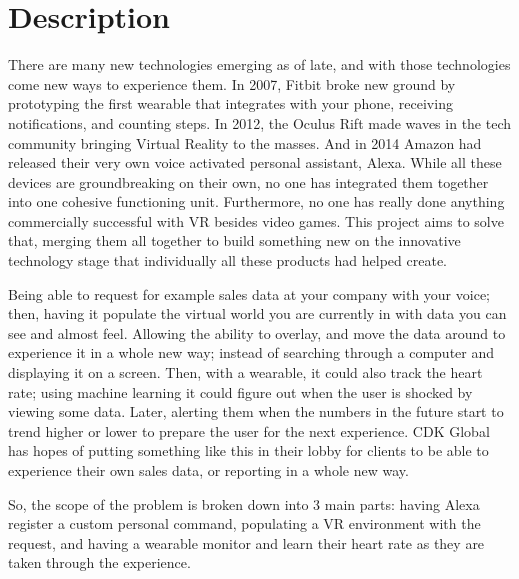 \documentclass[onecolumn, draftclsnofoot,10pt, compsoc]{IEEEtran}
\begin{document}
\begin{titlepage}
\begin{singlespace}
\begin{abstract}
        \end{abstract}
    \end{singlespace}
\end{titlepage}
\newpage
{}
\tableofcontents
\clearpage

\section{Description}
There are many new technologies emerging as of late, and with those technologies come new ways to experience them. In 2007, Fitbit broke new ground by prototyping the first wearable that integrates with your phone, receiving notifications, and counting steps. In 2012, the Oculus Rift made waves in the tech community bringing Virtual Reality to the masses. And in 2014 Amazon had released their very own voice activated personal assistant, Alexa. While all these devices are groundbreaking on their own, no one has integrated them together into one cohesive functioning unit. Furthermore, no one has really done anything commercially successful with VR besides video games. This project aims to solve that, merging them all together to build something new on the innovative technology stage that individually all these products had helped create.

Being able to request for example sales data at your company with your voice; then, having it populate the virtual world you are currently in with data you can see and almost feel. Allowing the ability to overlay, and move the data around to experience it in a whole new way; instead of searching through a computer and displaying it on a screen. Then, with a wearable, it could also track the heart rate; using machine learning it could figure out when the user is shocked by viewing some data. Later, alerting them when the numbers in the future start to trend higher or lower to prepare the user for the next experience. CDK Global has hopes of putting something like this in their lobby for clients to be able to experience their own sales data, or reporting in a whole new way.

So, the scope of the problem is broken down into 3 main parts: having Alexa register a custom personal command, populating a VR environment with the request, and having a wearable monitor and learn their heart rate as they are taken through the experience.
\end{document}
